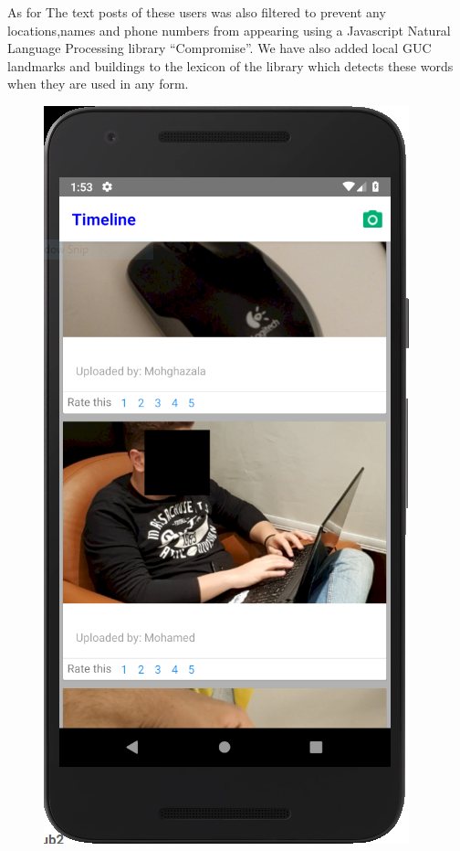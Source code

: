 As for The text posts of these users was also filtered to prevent any locations,names and phone numbers from appearing using a Javascript Natural Language Processing library  “Compromise”\cite{Compromise}. We have also added local GUC landmarks and buildings to the lexicon of the library which detects these words when they are used in any form.
\begin{figure}[!ht]
    \centering
    \begin{minipage}{.5\textwidth}
      \centering
      \includegraphics[width=.6\linewidth]{Blur}
      \label{fig:blur}
    \end{minipage}%
    \begin{minipage}{.5\textwidth}
      \centering

\end{minipage}
\end{figure}
